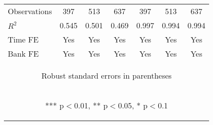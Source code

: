 \documentclass[]{article}
\begin{document}
\begin{center}
\begin{tabular}{lcccccc}
Observations & 397 & 513 & 637 & 397 & 513 & 637 \\
$R^2$ & 0.545 & 0.501 & 0.469 & 0.997 & 0.994 & 0.994 \\
Time FE & Yes & Yes & Yes & Yes & Yes & Yes \\
 Bank FE & Yes & Yes & Yes & Yes & Yes & Yes \\ \hline
\multicolumn{7}{c}{\begin{footnotesize} Robust standard errors in parentheses\end{footnotesize}} \\
\multicolumn{7}{c}{\begin{footnotesize} *** p$<$0.01, ** p$<$0.05, * p$<$0.1\end{footnotesize}} \\
\end{tabular}
\end{center}
\end{document}
